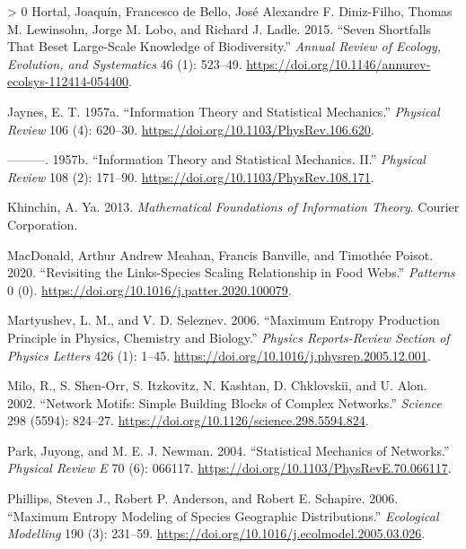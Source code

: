 \documentclass[11pt]{article}
\newlength{\cslhangindent}
\newenvironment{CSLReferences}[3] %
 {%
  \setlength{\parindent}{0pt}
  \ifodd #1 \everypar{\setlength{\hangindent}{\cslhangindent}}\ignorespaces\fi
  \ifnum #2 > 0
  \setlength{\parskip}{#2\baselineskip}
  \fi
 }%
 {}
\begin{document}
\begin{CSLReferences}{1}{0}
\leavevmode\hypertarget{ref-Hortal2015SevSho}{}%
Hortal, Joaquín, Francesco de Bello, José Alexandre F. Diniz-Filho,
Thomas M. Lewinsohn, Jorge M. Lobo, and Richard J. Ladle. 2015. {``Seven
Shortfalls That Beset Large-Scale Knowledge of Biodiversity.''}
\emph{Annual Review of Ecology, Evolution, and Systematics} 46 (1):
523--49. \url{https://doi.org/10.1146/annurev-ecolsys-112414-054400}.

\leavevmode\hypertarget{ref-Jaynes1957InfThe}{}%
Jaynes, E. T. 1957a. {``Information Theory and Statistical Mechanics.''}
\emph{Physical Review} 106 (4): 620--30.
\url{https://doi.org/10.1103/PhysRev.106.620}.

\leavevmode\hypertarget{ref-Jaynes1957InfThea}{}%
---------. 1957b. {``Information Theory and Statistical Mechanics.
II.''} \emph{Physical Review} 108 (2): 171--90.
\url{https://doi.org/10.1103/PhysRev.108.171}.

\leavevmode\hypertarget{ref-Khinchin2013MatFou}{}%
Khinchin, A. Ya. 2013. \emph{Mathematical Foundations of Information
Theory}. Courier Corporation.

\leavevmode\hypertarget{ref-MacDonald2020RevLin}{}%
MacDonald, Arthur Andrew Meahan, Francis Banville, and Timothée Poisot.
2020. {``Revisiting the Links-Species Scaling Relationship in Food
Webs.''} \emph{Patterns} 0 (0).
\url{https://doi.org/10.1016/j.patter.2020.100079}.

\leavevmode\hypertarget{ref-Martyushev2006MaxEnt}{}%
Martyushev, L. M., and V. D. Seleznev. 2006. {``Maximum Entropy
Production Principle in Physics, Chemistry and Biology.''} \emph{Physics
Reports-Review Section of Physics Letters} 426 (1): 1--45.
\url{https://doi.org/10.1016/j.physrep.2005.12.001}.

\leavevmode\hypertarget{ref-Milo2002NetMot}{}%
Milo, R., S. Shen-Orr, S. Itzkovitz, N. Kashtan, D. Chklovskii, and U.
Alon. 2002. {``Network Motifs: Simple Building Blocks of Complex
Networks.''} \emph{Science} 298 (5594): 824--27.
\url{https://doi.org/10.1126/science.298.5594.824}.

\leavevmode\hypertarget{ref-Park2004StaMeca}{}%
Park, Juyong, and M. E. J. Newman. 2004. {``Statistical Mechanics of
Networks.''} \emph{Physical Review E} 70 (6): 066117.
\url{https://doi.org/10.1103/PhysRevE.70.066117}.

\leavevmode\hypertarget{ref-Phillips2006MaxEnta}{}%
Phillips, Steven J., Robert P. Anderson, and Robert E. Schapire. 2006.
{``Maximum Entropy Modeling of Species Geographic Distributions.''}
\emph{Ecological Modelling} 190 (3): 231--59.
\url{https://doi.org/10.1016/j.ecolmodel.2005.03.026}.


\end{CSLReferences}
\end{document}
